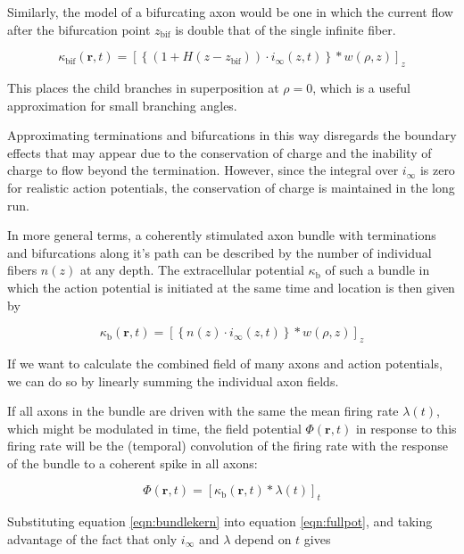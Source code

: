 \documentclass[]{article}
\begin{document}
Similarly, the model of a bifurcating axon would be one in which the
current flow after the bifurcation point \(z_\text{bif}\) is double that
of the single infinite fiber.

\begin{equation}
  \kappa_{\text{bif}}(\mathbf{r},t) = \left[\left\{\left(1+H(z-z_\text{bif})\right)\cdot i_{\infty}(z,t)\right\}\ast w(\rho,z)\right]_z
\end{equation}

This places the child branches in superposition at \(\rho=0\), which is
a useful approximation for small branching angles.

Approximating terminations and bifurcations in this way disregards the
boundary effects that may appear due to the conservation of charge and
the inability of charge to flow beyond the termination. However, since
the integral over \(i_\infty\) is zero for realistic action potentials,
the conservation of charge is maintained in the long run.

In more general terms, a coherently stimulated axon bundle with
terminations and bifurcations along it's path can be described by the
number of individual fibers \(n(z)\) at any depth. The extracellular
potential \(\kappa_\text{b}\) of such a bundle in which the action
potential is initiated at the same time and location is then given by

\begin{equation}
  \kappa_{\text{b}}(\mathbf{r},t) = \left[\left\{n(z)\cdot i_{\infty}(z,t)\right\}\ast w(\rho,z)\right]_z
  \label{eqn:bundlekern}
\end{equation}

If we want to calculate the combined field of many axons and action
potentials, we can do so by linearly summing the individual axon fields.

If all axons in the bundle are driven with the same the mean firing rate
\(\lambda(t)\), which might be modulated in time, the field potential
\(\Phi(\mathbf{r},t)\) in response to this firing rate will be the
(temporal) convolution of the firing rate with the response of the
bundle to a coherent spike in all axons:

\begin{equation}
  \Phi(\mathbf{r},t) = \left[\kappa_\text{b}(\mathbf{r},t) \ast \lambda(t)\right]_t
  \label{eqn:fullpot}
\end{equation}

Substituting equation \ref{eqn:bundlekern} into equation
\ref{eqn:fullpot}, and taking advantage of the fact that only
\(i_\infty\) and \(\lambda\) depend on \(t\) gives
\end{document}
